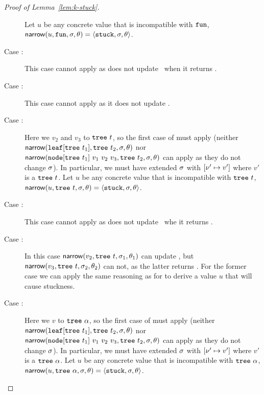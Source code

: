 \begin{proof}[Proof of Lemma~\ref{lem:k-stuck}]
\begin{description}
      Let $u$ be any concrete value that is incompatible with $\mathtt{fun}$,
      $\mathsf{narrow}(u, \mathtt{fun}, \sigma, \theta) = \langle \mathtt{stuck}, \sigma, \theta \rangle$.
    \item[Case \reappbad:]
      This case cannot apply as \forcesym does not update \vsu\ when
      it returns \stuck.
    \item[Case \releafgood:]
      This case cannot apply as it does not update \vsu.
    \item[Case \renodegood:]
      Here we \forcesym $v_2$ and $v_3$ to $\mathtt{tree}\ t$, so the first
      case of \forcesym must apply
      (neither\\ $\mathsf{narrow}(\mathtt{leaf}[\mathtt{tree}\ t_1], \mathtt{tree}\ t_2, \sigma, \theta)$
       nor\\ $\mathsf{narrow}(\mathtt{node}[\mathtt{tree}\ t_1]\ v_1\ v_2\ v_3, \mathtt{tree}\ t_2, \sigma, \theta)$
       can apply as they do not change $\sigma$).
      In particular, we must have extended $\sigma$ with
      $[\nu' \mapsto v']$ where $v'$ is a $\mathtt{tree}\ t$.
      Let $u$ be any concrete value that is incompatible with $\mathtt{tree}\ t$,
      $\mathsf{narrow}(u, \mathtt{tree}\ t, \sigma, \theta) = \langle \mathtt{stuck}, \sigma, \theta \rangle$.
    \item[Case \renodebadone:]
      This case cannot apply as \forcesym does not update \vsu\ whe
      it returns \stuck.
    \item[Case \renodebadtwo:]
      In this case $\mathsf{narrow}(v_2, \mathtt{tree}\ t, \sigma_1, \theta_1)$ can update
      \vsu, but $\mathsf{narrow}(v_3, \mathtt{tree}\ t, \sigma_2, \theta_2)$ can not, as the
      latter returns \stuck.
      For the former case we can apply the same reasoning as for
      \renodegood to derive a value $u$ that will cause stuckness.
    \item[Case \rulename{E-Case-Good\{1,2\}}:]
      Here we \forcesym $v$ to $\mathtt{tree}\ \alpha$, so the first case of \forcesym
      must apply
      (neither\\ $\mathsf{narrow}(\mathtt{leaf}[\mathtt{tree}\ t_1], \mathtt{tree}\ t_2, \sigma, \theta)$
       nor\\ $\mathsf{narrow}(\mathtt{node}[\mathtt{tree}\ t_1]\ v_1\ v_2\ v_3, \mathtt{tree}\ t_2, \sigma, \theta)$
       can apply as they do not change $\sigma$).
      In particular, we must have extended $\sigma$ with
      $[\nu' \mapsto v']$ where $v'$ is a $\mathtt{tree}\ \alpha$.
      Let $u$ be any concrete value that is incompatible with $\mathtt{tree}\ \alpha$,
      $\mathsf{narrow}(u, \mathtt{tree}\ \alpha, \sigma, \theta) = \langle \mathtt{stuck}, \sigma, \theta \rangle$.
    \end{description}

\end{proof}
